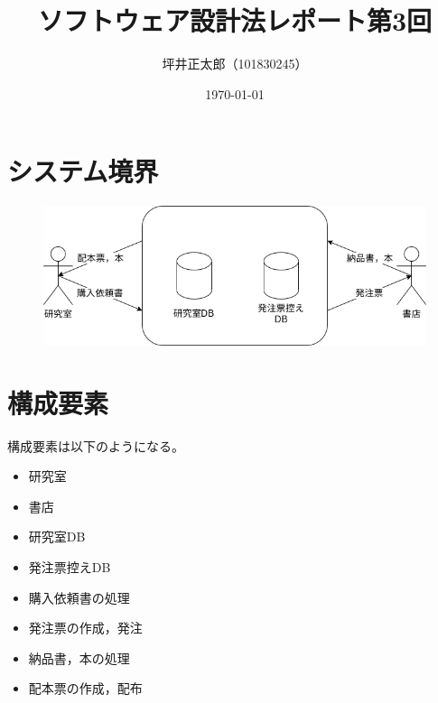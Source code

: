 \documentclass[a4paper,10pt]{jsarticle}
\begin{document}
\title{ソフトウェア設計法レポート第3回}
\author{坪井正太郎（101830245）}
\date{\today}
\maketitle
\section{システム境界}
\begin{figure}[htb]
  \centering
  \includegraphics[width=\linewidth]{./01.png}
\end{figure}

\section{構成要素}
構成要素は以下のようになる。
\begin{itemize}
  \item 研究室
  \item 書店
  \item 研究室DB
  \item 発注票控えDB
  \item 購入依頼書の処理
  \item 発注票の作成，発注
  \item 納品書，本の処理
  \item 配本票の作成，配布
\end{itemize}
\end{document}
